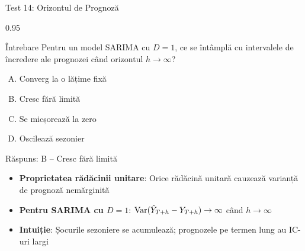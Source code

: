 \documentclass[9pt, aspectratio=169, t]{beamer}
\begin{document}
\begin{frame}{Test 14: Orizontul de Prognoză}
    \begin{cminipage}{0.95\textwidth}
    \begin{alertblock}{Întrebare}
        Pentru un model SARIMA cu $D=1$, ce se întâmplă cu intervalele de încredere ale prognozei când orizontul $h \to \infty$?
    \end{alertblock}

    \vspace{0.3cm}

    \begin{enumerate}[A)]\setlength{\itemsep}{0pt}
        \item Converg la o lățime fixă
        \item Cresc fără limită
        \item Se micșorează la zero
        \item Oscilează sezonier
    \end{enumerate}

    \vspace{0.5cm}
    \pause
    \begin{exampleblock}{Răspuns: B -- Cresc fără limită}
        {\small
        \begin{itemize}\setlength{\itemsep}{0pt}
        \item \textbf{Proprietatea rădăcinii unitare}: Orice rădăcină unitară cauzează varianță de prognoză nemărginită
        \item \textbf{Pentru SARIMA cu $D=1$}: $\text{Var}(\hat{Y}_{T+h} - Y_{T+h}) \to \infty$ când $h \to \infty$
        \item \textbf{Intuiție}: Șocurile sezoniere se acumulează; prognozele pe termen lung au IC-uri largi
        \end{itemize}
        }
    \end{exampleblock}
    \end{cminipage}
\end{frame}
\end{document}

